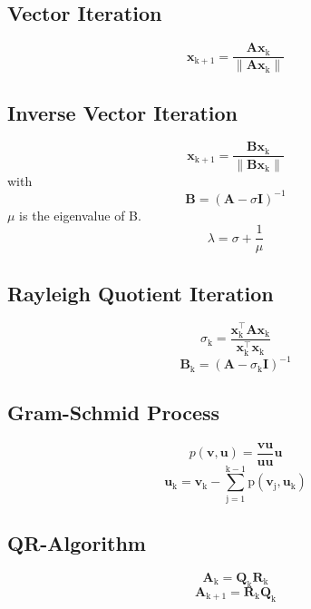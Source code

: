 \documentclass[conference]{IEEEtran}
\begin{document}
\subsection*{Vector Iteration}
\begin{equation}
\textbf{x}_\mathrm{k+1}=\frac{\textbf{Ax}_\mathrm{k}}{\lVert \textbf{Ax}_\mathrm{k} \rVert}
\end{equation}
\subsection*{Inverse Vector Iteration}
\begin{equation}
\textbf{x}_\mathrm{k+1}=\frac{\textbf{Bx}_\mathrm{k}}{\lVert \textbf{Bx}_\mathrm{k} \rVert}
\end{equation}
with
\begin{equation}
\textbf{B}=(\textbf{A}-\sigma \textbf{I})^{-1}
\end{equation}
$\mu$ is the eigenvalue of B.
\begin{equation}
\lambda=\sigma+\frac{1}{\mu}
\end{equation}
\subsection*{Rayleigh Quotient Iteration}
\begin{equation}
\sigma_{\mathrm{k}}=\frac{\textbf{x}_{\mathrm{k}}^\intercal\textbf{Ax}_{\mathrm{k}}}{\textbf{x}_{\mathrm{k}}^\intercal\textbf{x}_{\mathrm{k}}}
\end{equation}
\begin{equation}
\textbf{B}_{\mathrm{k}}=(\textbf{A}-\sigma_{\mathrm{k}} \textbf{I})^{-1}
\end{equation}
\subsection*{Gram-Schmid Process}
\begin{equation}
p(\textbf{v},\textbf{u})=\frac{\textbf{v}\textbf{u}}{\textbf{u}\textbf{u}}\textbf{u}
\end{equation}
\begin{equation}
\textbf{u}_{\mathrm{k}} = \textbf{v}_{\mathrm{k}} -\sum_{\mathrm{j=1}}^{\mathrm{k-1}}\mathrm{p}(\textbf{v}_{\mathrm{j}},\textbf{u}_{\mathrm{k}})
\end{equation}
\subsection*{QR-Algorithm}
\begin{equation}
\textbf{A}_\mathrm{k}={\textbf{Q}_\mathrm{k}}{\textbf{R}_\mathrm{k}}
\end{equation}
\begin{equation}
\textbf{A}_\mathrm{k+1}={\textbf{R}_\mathrm{k}}{\textbf{Q}_\mathrm{k}}
\end{equation}
\end{document}
